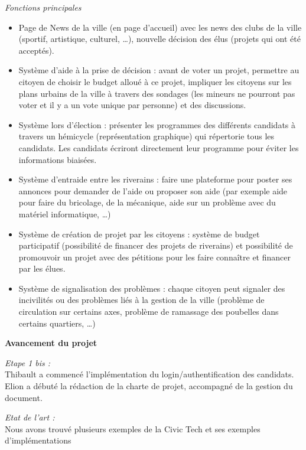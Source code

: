 \noindent
\textit{Fonctions principales}
\begin{itemize}
    \item Page de News de la ville (en page d'accueil) avec les news des clubs de la ville (sportif, artistique, culturel, …), nouvelle décision des élus (projets qui ont été acceptés).
    \item Système d’aide à la prise de décision : avant de voter un projet, permettre au citoyen de choisir le budget alloué à ce projet, impliquer les citoyens sur les plans urbains de la ville à travers des sondages (les mineurs ne pourront pas voter et il y a un vote unique par personne) et des discussions. 
    \item Système lors d'élection : présenter les programmes des différents candidats à travers un hémicycle (représentation graphique) qui répertorie tous les candidats. Les candidats écriront directement leur programme pour éviter les informations biaisées.
    \item Système d’entraide entre les riverains : faire une plateforme pour poster ses annonces pour demander de l’aide ou proposer son aide (par exemple aide pour faire du bricolage, de la mécanique, aide sur un problème avec du matériel informatique, …)
    \item Système de création de projet par les citoyens : système de budget participatif (possibilité de financer des projets de riverains) et possibilité de promouvoir un projet avec des pétitions pour les faire connaître et financer par les élues.
    \item Système de signalisation des problèmes : chaque citoyen peut signaler des incivilités ou des problèmes liés à la gestion de la ville (problème de circulation sur certains axes, problème de ramassage des poubelles dans certains quartiers, …)

\end{itemize}

\vskip 0.5cm

\noindent
\textbf{Avancement du projet}

\vskip 0.25cm
\noindent
\textit{Etape 1 bis :} \\
Thibault a commencé l'implémentation du login/authentification des candidats.
\\Elion a débuté la rédaction de la charte de projet, accompagné de la gestion du document.

\vskip 0.25cm

\noindent
\textit{Etat de l'art :}
\\Nous avons trouvé plusieurs exemples de la Civic Tech et ses exemples d'implémentations 

